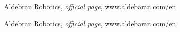 \begin{thebibliography}{99999}
\singlespace\normalsize

 Aldebran Robotics, \textit{ official page}, \url{www.aldebaran.com/en}

 Aldebran Robotics, \textit{ official page}, \url{www.aldebaran.com/en}

\end{thebibliography}

